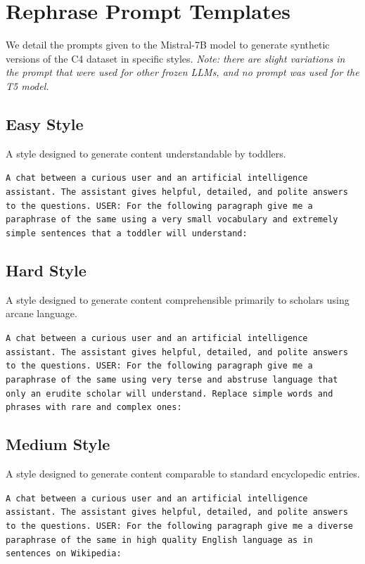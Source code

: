\documentclass[table]{article}
\begin{document}
\clearpage

\section{Rephrase Prompt Templates}
\label{app:prompt_styles}
We detail the prompts given to the Mistral-7B model to generate synthetic versions of the C4 dataset in specific styles.  \emph{Note: there are slight variations in the prompt that were used for other frozen LLMs, and no prompt was used for the T5 model.}

\subsection*{Easy Style}
A style designed to generate content understandable by toddlers.
\begin{tcolorbox}[colback=gray!20, colframe=gray!75, rounded corners, sharp corners=northeast, sharp corners=southwest]
\texttt{A chat between a curious user and an artificial intelligence assistant. The assistant gives helpful, detailed, and polite answers to the questions. USER: For the following paragraph give me a paraphrase of the same using a very small vocabulary and extremely simple sentences that a toddler will understand:}
\end{tcolorbox}

\subsection*{Hard Style}
A style designed to generate content comprehensible primarily to scholars using arcane language.
\begin{tcolorbox}[colback=gray!20, colframe=gray!75, rounded corners, sharp corners=northeast, sharp corners=southwest]
\texttt{A chat between a curious user and an artificial intelligence assistant. The assistant gives helpful, detailed, and polite answers to the questions. USER: For the following paragraph give me a paraphrase of the same using very terse and abstruse language that only an erudite scholar will understand. Replace simple words and phrases with rare and complex ones:}
\end{tcolorbox}

\subsection*{Medium Style}
A style designed to generate content comparable to standard encyclopedic entries.
\begin{tcolorbox}[colback=gray!20, colframe=gray!75, rounded corners, sharp corners=northeast, sharp corners=southwest]
\texttt{A chat between a curious user and an artificial intelligence assistant. The assistant gives helpful, detailed, and polite answers to the questions. USER: For the following paragraph give me a diverse paraphrase of the same in high quality English language as in sentences on Wikipedia:}
\end{tcolorbox}
\end{document}
